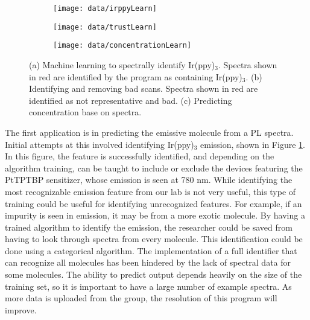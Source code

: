 \documentclass[../thesis.tex]{subfiles}
\begin{document}
\begin{figure}[ht]
\centering
    \begin{subfigure}{.3\textwidth}
    \texttt{[image: data/irppyLearn]}
    \caption{}
    \label{fig:data_ml_irppy}\par\vfill
    \end{subfigure}
    \begin{subfigure}{.3\textwidth}
    \texttt{[image: data/trustLearn]}
    \caption{}
    \label{fig:data_ml_trust}\par\vfill
    \end{subfigure}
    \begin{subfigure}{.3\textwidth}
    \texttt{[image: data/concentrationLearn]}
    \caption{}
    \label{fig:data_ml_concentration}\par\vfill
    \end{subfigure}
\caption{  (a) Machine learning to spectrally identify Ir(ppy)$_3$.  Spectra shown in red are identified by the program as containing Ir(ppy)$_3$. (b) Identifying and removing bad \eqe scans.  Spectra shown in red are identified as not representative and bad.  (c) Predicting concentration base on spectra.}
\end{figure}

The first application is in predicting the emissive molecule from a PL spectra.
Initial attempts at this involved identifying Ir(ppy)$_3$ emission, shown in Figure \ref{fig:data_ml_irppy}.
In this figure, the \irppy feature is successfully identified, and depending on the algorithm training, can be taught to include or exclude the devices featuring the PtTPTBP sensitizer, whose emission is seen at 780 nm.
While identifying the most recognizable emission feature from our lab is not very useful, this type of training could be useful for identifying unrecognized features.
For example, if an impurity is seen in emission, it may be from a more exotic molecule.  
By having a trained algorithm to identify the emission, the researcher could be saved from having to look through spectra from every molecule.
This identification could be done using a categorical algorithm.
The implementation of a full identifier that can recognize all molecules has been hindered by the lack of spectral data for some molecules.
The ability to predict output depends heavily on the size of the training set, so it is important to have a large number of example spectra.
As more data is uploaded from the group, the resolution of this program will improve.
\end{document}
